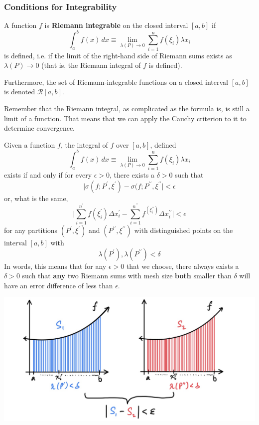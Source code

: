   \subsubsection{Conditions for Integrability}

    \begin{definition}
      A function $f$ is \textbf{Riemann integrable} on the closed interval $[a, b]$ if 
      \[\int_a^b f(x)\,dx \equiv \lim_{\lambda(P) \rightarrow 0} \sum_{i=1}^n f(\xi_i) \lambda x_i\]
      is defined, i.e. if the limit of the right-hand side of Riemann sums exists as $\lambda(P) \rightarrow 0$ (that is, the Riemann integral of $f$ is defined). 

      Furthermore, the set of Riemann-integrable functions on a closed interval $[a, b]$ is denoted $\mathcal{R}[a,b]$. 
    \end{definition}

    Remember that the Riemann integral, as complicated as the formula is, is still a limit of a function. That means that we can apply the Cauchy criterion to it to determine convergence. 

    \begin{lemma}
      Given a function $f$, the integral of $f$ over $[a, b]$, defined
      \[\int_a^b f(x)\,dx \equiv \lim_{\lambda(P) \rightarrow 0} \sum_{i=1}^n f(\xi_i) \lambda x_i\]
      exists if and only if for every $\epsilon>0$, there exists a $\delta>0$ such that 
      \[\big| \sigma(f; P^\prime, \xi^\prime) - \sigma(f; P^{\prime\prime}, \xi^{\prime\prime} \big| < \epsilon\]
      or, what is the same, 
      \[\Bigg| \sum_{i=1}^{n^\prime} f(\xi_i^\prime) \Delta x_i^\prime - \sum_{i=1}^{n^{\prime\prime}} f^(\xi_i^{\prime\prime}) \Delta x_i^{\prime\prime} \Bigg| < \epsilon\]
      for any partitions $(P^\prime, \xi^\prime)$ and $(P^{\prime\prime}, \xi^{\prime\prime})$ with distinguished points on the interval $[a, b]$ with
      \[\lambda(P^\prime), \lambda(P^{\prime\prime}) < \delta\]
      In words, this means that for any $\epsilon>0$ that we choose, there always exists a $\delta>0$ such that \textbf{any} two Riemann sums with mesh size \textbf{both} smaller than $\delta$ will have an error difference of less than $\epsilon$. \begin{center}
          \includegraphics[scale=0.25]{img/Cauchy_Criterion_of_Riemann_Integral.jpg}
      \end{center}
    \end{lemma}

